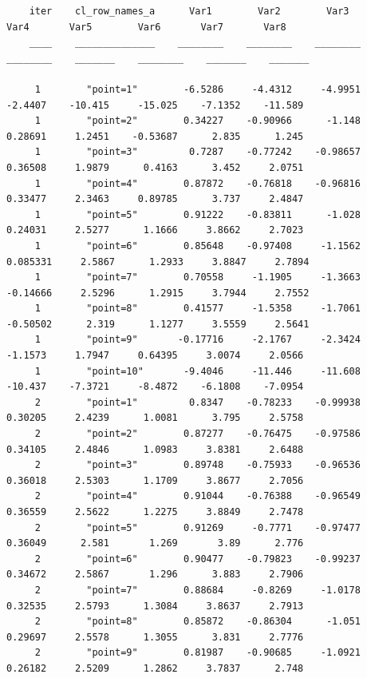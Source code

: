 \documentclass[
]{book}
\begin{document}
\begin{verbatim}
    iter    cl_row_names_a      Var1        Var2        Var3        Var4       Var5        Var6       Var7       Var8  
    ____    ______________    ________    ________    ________    ________    _______    ________    _______    _______

     1        "point=1"        -6.5286     -4.4312     -4.9951     -2.4407    -10.415     -15.025    -7.1352    -11.589
     1        "point=2"        0.34227    -0.90966      -1.148     0.28691     1.2451    -0.53687      2.835      1.245
     1        "point=3"         0.7287    -0.77242    -0.98657     0.36508     1.9879      0.4163      3.452     2.0751
     1        "point=4"        0.87872    -0.76818    -0.96816     0.33477     2.3463     0.89785      3.737     2.4847
     1        "point=5"        0.91222    -0.83811      -1.028     0.24031     2.5277      1.1666     3.8662     2.7023
     1        "point=6"        0.85648    -0.97408     -1.1562    0.085331     2.5867      1.2933     3.8847     2.7894
     1        "point=7"        0.70558     -1.1905     -1.3663    -0.14666     2.5296      1.2915     3.7944     2.7552
     1        "point=8"        0.41577     -1.5358     -1.7061    -0.50502      2.319      1.1277     3.5559     2.5641
     1        "point=9"       -0.17716     -2.1767     -2.3424     -1.1573     1.7947     0.64395     3.0074     2.0566
     1        "point=10"       -9.4046     -11.446     -11.608     -10.437    -7.3721     -8.4872    -6.1808    -7.0954
     2        "point=1"         0.8347    -0.78233    -0.99938     0.30205     2.4239      1.0081      3.795     2.5758
     2        "point=2"        0.87277    -0.76475    -0.97586     0.34105     2.4846      1.0983     3.8381     2.6488
     2        "point=3"        0.89748    -0.75933    -0.96536     0.36018     2.5303      1.1709     3.8677     2.7056
     2        "point=4"        0.91044    -0.76388    -0.96549     0.36559     2.5622      1.2275     3.8849     2.7478
     2        "point=5"        0.91269     -0.7771    -0.97477     0.36049      2.581       1.269       3.89      2.776
     2        "point=6"        0.90477    -0.79823    -0.99237     0.34672     2.5867       1.296      3.883     2.7906
     2        "point=7"        0.88684     -0.8269     -1.0178     0.32535     2.5793      1.3084     3.8637     2.7913
     2        "point=8"        0.85872    -0.86304      -1.051     0.29697     2.5578      1.3055      3.831     2.7776
     2        "point=9"        0.81987    -0.90685     -1.0921     0.26182     2.5209      1.2862     3.7837      2.748

\end{verbatim}
\end{document}
